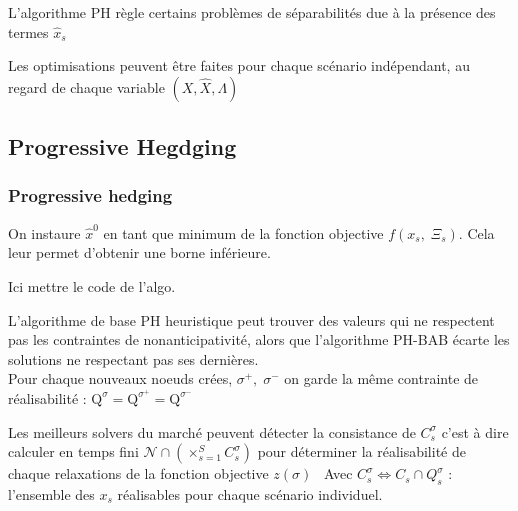 \documentclass[10pt]{beamer}
\begin{document}
    \begin{frame}
        L'algorithme PH règle certains problèmes de séparabilités due à la présence des termes $\hat{x}_s$
    \end{frame}
    
    \begin{frame}
        Les optimisations peuvent être faites pour chaque scénario indépendant, au regard de chaque variable $(X, \hat{X}, \Lambda)$
    \end{frame}
    
    
    
    \subsection{Progressive Hegdging}  
    \begin{frame}
        \frametitle{Progressive hedging}
        On instaure $\hat{x}^0$ en tant que minimum de la fonction objective $f(x_s, \; \Xi_s)$. Cela leur permet d'obtenir une borne inférieure.
    \end{frame}
    
    \begin{frame}
         Ici mettre le code de l'algo.
    \end{frame}
    
    \begin{frame}
       L'algorithme de base PH heuristique peut trouver des valeurs qui ne respectent pas les contraintes de nonanticipativité, alors que l'algorithme PH-BAB écarte les solutions ne respectant pas ses dernières.\\
       Pour chaque nouveaux noeuds crées, $\sigma^+,\;\sigma^-$ on garde la même contrainte de réalisabilité : $\mathrm{Q}^\sigma = \mathrm{Q}^{\sigma^+} = \mathrm{Q}^{\sigma^-}$
    \end{frame}
    
    \begin{frame}
      Les meilleurs solvers du marché peuvent détecter la consistance de $C_s^\sigma$ c'est à dire calculer en temps fini 
      $\mathcal{N}\cap(\times_{s = 1}^S C_s^\sigma)$ pour déterminer la réalisabilité de chaque relaxations de la fonction objective $z(\sigma)$
      \
      Avec $C_s^\sigma \Leftrightarrow C_s \cap Q_s^\sigma$ : l'ensemble des $x_s$ réalisables pour chaque scénario individuel.
    \end{frame}
    
\end{document}
